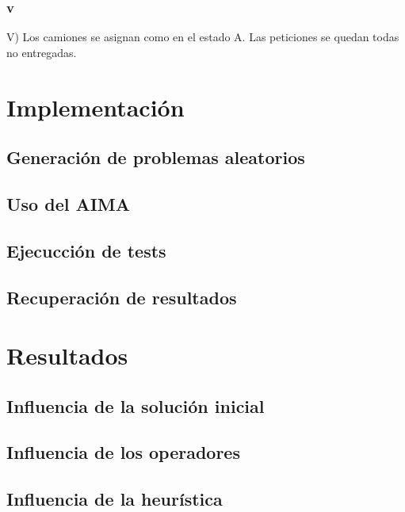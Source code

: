 \documentclass{article}
\begin{document}
\subsubsection{v}
V) Los camiones se asignan como en el estado A. Las peticiones se quedan todas no entregadas.


\section{Implementación}

\subsection{Generación de problemas aleatorios}

\subsection{Uso del AIMA}

\subsection{Ejecucción de tests}

\subsection{Recuperación de resultados}


\section{Resultados}

\subsection{Influencia de la solución inicial}

\subsection{Influencia de los operadores}

\subsection{Influencia de la heurística}
\end{document}
